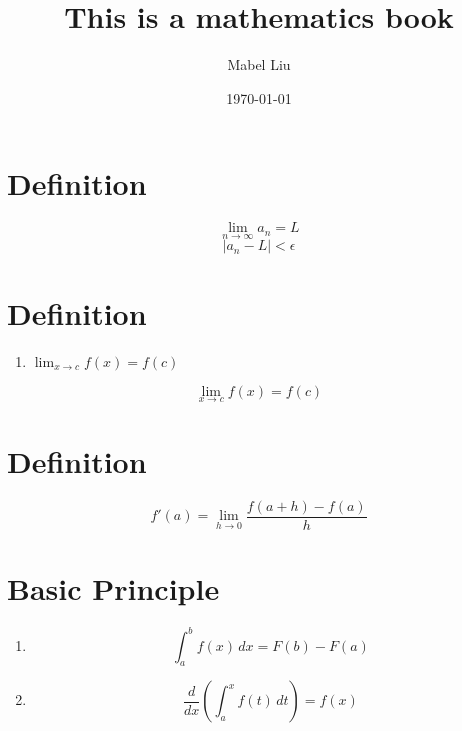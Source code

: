 \documentclass{article}
\begin{document}
\title{This is a mathematics book}
\author{Mabel Liu}
\date{\today}
\maketitle

\section*{Definition}
\[
\lim_{n \to \infty} a_n = L
\]
\[
|a_n - L| < \epsilon
\]

\section*{Definition}
\begin{enumerate}
    \item \( \lim_{x \to c} f(x) = f(c) \) 
\end{enumerate}

\[
\lim_{x \to c} f(x) = f(c)
\]

\section*{Definition}
\[
f'(a) = \lim_{h \to 0} \frac{f(a+h) - f(a)}{h}
\]

\section*{Basic Principle}
\begin{enumerate}
    \item \[
    \int_a^b f(x) \, dx = F(b) - F(a)
    \]
    \item \[
    \frac{d}{dx} \left( \int_a^x f(t) \, dt \right) = f(x)
    \]
\end{enumerate}
\end{document}
